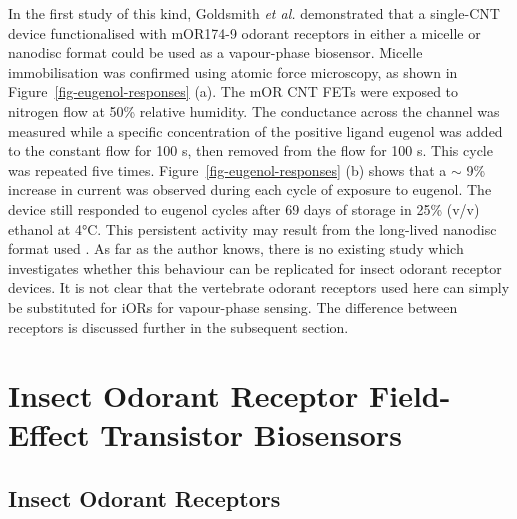 \documentclass[
  a4paper,
]{scrbook}
\begin{document}
In the first study of this kind, Goldsmith \emph{et al.} demonstrated
that a single-CNT device functionalised with mOR174-9 odorant receptors
in either a micelle or nanodisc format could be used as a vapour-phase
biosensor. Micelle immobilisation was confirmed using atomic force
microscopy, as shown in Figure~\ref{fig-eugenol-responses} (a). The mOR
CNT FETs were exposed to nitrogen flow at 50\% relative humidity. The
conductance across the channel was measured while a specific
concentration of the positive ligand eugenol was added to the constant
flow for 100 s, then removed from the flow for 100 s. This cycle was
repeated five times. Figure~\ref{fig-eugenol-responses} (b) shows that a
\(\sim\) 9\% increase in current was observed during each cycle of
exposure to eugenol. The device still responded to eugenol cycles after
69 days of storage in 25\% (v/v) ethanol at 4°C. This persistent
activity may result from the long-lived nanodisc format used
\autocite{Goldsmith2011}. As far as the author knows, there is no
existing study which investigates whether this behaviour can be
replicated for insect odorant receptor devices. It is not clear that the
vertebrate odorant receptors used here can simply be substituted for
iORs for vapour-phase sensing. The difference between receptors is
discussed further in the subsequent section.

\hypertarget{sec-insect-OR-biosensors}{%
\section{Insect Odorant Receptor Field-Effect Transistor
Biosensors}\label{sec-insect-OR-biosensors}}

\hypertarget{insect-odorant-receptors}{%
\subsection{Insect Odorant Receptors}\label{insect-odorant-receptors}}
\end{document}

